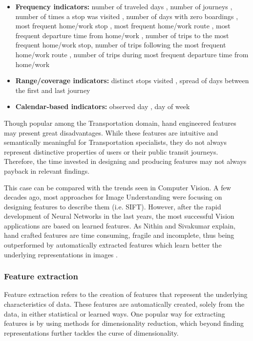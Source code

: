 \documentclass{article}
\begin{document}
\begin{itemize}
\item \textbf{Frequency indicators:} number of traveled days \cite{bhaskar2015passenger} \cite{langlois2016inferring} \cite{ma2017understanding}, number of journeys \cite{bhaskar2015passenger}, number of times a stop was visited \cite{morency2007measuring}, number of days with zero boardings \cite{morency2007measuring}, most frequent home/work stop \cite{ma2017understanding}, most frequent home/work route \cite{ma2017understanding}, most frequent departure time from home/work \cite{ma2017understanding}, number of trips to the most frequent home/work stop\cite{ma2017understanding}, number of trips following the most frequent home/work route \cite{ma2017understanding}, number of trips during most frequent departure time from home/work \cite{ma2017understanding}

\item \textbf{Range/coverage indicators:} distinct stops visited \cite{morency2007measuring}, spread of days between the first and last journey \cite{langlois2016inferring}

\item \textbf{Calendar-based indicators:} observed day \cite{morency2007measuring}, day of week \cite{morency2007measuring}

\end{itemize}

Though popular among the Transportation domain, hand engineered features may present great disadvantages. While these features are intuitive and semantically meaningful for Transportation specialists, they do not always represent distinctive properties of users or their public transit journeys. Therefore, the time invested in designing and producing features may not always payback in relevant findings. 

This case can be compared with the trends seen in Computer Vision. A few decades ago, most approaches for Image Understanding were focusing on designing features to describe them (i.e. SIFT). However, after the rapid development of Neural Networks in the last years, the most successful Vision applications are based on learned features. As Nithin and Sivakumar explain, hand crafted features are time consuming, fragile and incomplete, thus being outperformed by automatically extracted features which learn better the underlying representations in images \cite{nithin2015generic}. 


\subsubsection{Feature extraction}
Feature extraction refers to the creation of features that represent the underlying characteristics of data. These features are automatically created, solely from the data, in either statistical or learned ways. One popular way for extracting features is by using methods for dimensionality reduction, which beyond finding representations further tackles the curse of dimensionality. 
\end{document}
